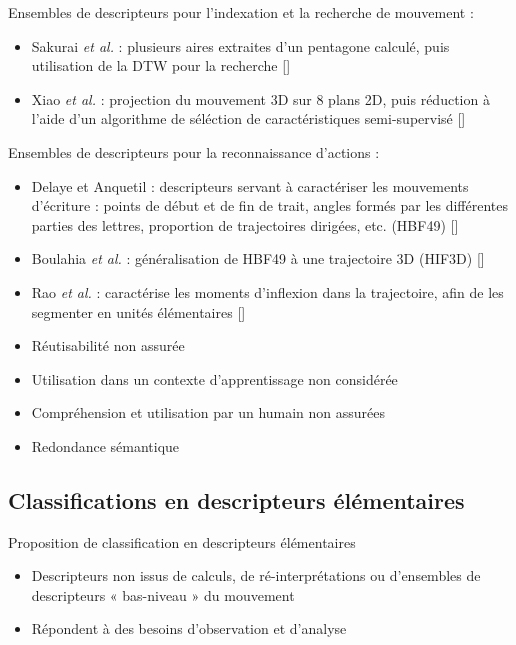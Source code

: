 \documentclass[svgnames]{beamer}
\newcommand{\mycite}[1]{[\textit{\cite{#1}}]}
\begin{document}
	\begin{frame}{\subsecname}
		Ensembles de descripteurs pour l'indexation et la recherche de mouvement :
		\begin{itemize}[label=$\bullet$]
			\item Sakurai \textit{et al.} : plusieurs aires extraites d'un pentagone calculé, puis utilisation de la DTW pour la recherche \mycite{Sakurai2015Ros}
			\item Xiao \textit{et al.} : projection du mouvement 3D sur 8 plans 2D, puis réduction à l'aide d'un algorithme de séléction de caractéristiques semi-supervisé \mycite{Xiao2015Sbh}
		\end{itemize}
	\end{frame}
	
	\begin{frame}{\subsecname}
		Ensembles de descripteurs pour la reconnaissance d'actions :
		\begin{itemize}[label=$\bullet$]
			\item  Delaye et Anquetil : descripteurs servant à caractériser les mouvements d'écriture : points de début et de fin de trait, angles formés par les différentes parties des lettres, proportion de trajectoires dirigées, etc. (HBF49) \mycite{Delaye2013HBF}
			\item Boulahia \textit{et al.} : généralisation de HBF49 à une trajectoire 3D (HIF3D) \mycite{Boulahia2016HIF}
			\item Rao \textit{et al.} : caractérise les moments d'inflexion dans la trajectoire, afin de les segmenter en unités élémentaires \mycite{Rao2002VRR}
		\end{itemize}
	\end{frame}
	
	\begin{frame}{\subsecname}
		\begin{itemize}[label=$\bullet$]
			\item Réutisabilité non assurée
			\item Utilisation dans un contexte d'apprentissage non considérée
			\item Compréhension et utilisation par un humain non assurées
			\item Redondance sémantique
		\end{itemize}
	\end{frame}
	
	\subsection{Classifications en descripteurs élémentaires}
	\begin{frame}{\subsecname}
	Proposition de classification en descripteurs élémentaires
		\begin{itemize}[label=$\bullet$]
			\item Descripteurs non issus de calculs, de ré-interprétations ou d'ensembles de descripteurs « bas-niveau » du mouvement
			\item Répondent à des besoins d'observation et d'analyse
		\end{itemize}
	\end{frame}
	
\end{document}
